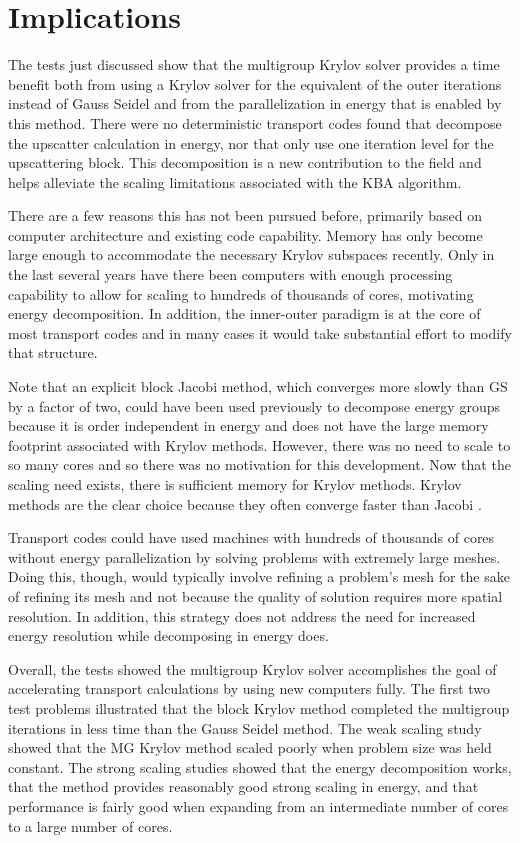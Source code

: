 \section{Implications}
The tests just discussed show that the multigroup Krylov solver provides a time benefit both from using a Krylov solver for the equivalent of the outer iterations instead of Gauss Seidel and from the parallelization in energy that is enabled by this method. There were no deterministic transport codes found that decompose the upscatter calculation in energy, nor that only use one iteration level for the upscattering block. This decomposition is a new contribution to the field and helps alleviate the scaling limitations associated with the KBA algorithm.   

There are a few reasons this has not been pursued before, primarily based on computer architecture and existing code capability. Memory has only become large enough to accommodate the necessary Krylov subspaces recently. Only in the last several years have there been computers with enough processing capability to allow for scaling to hundreds of thousands of cores, motivating energy decomposition. In addition, the inner-outer paradigm is at the core of most transport codes and in many cases it would take substantial effort to modify that structure. 

Note that an explicit block Jacobi method, which converges more slowly than GS by a factor of two, could have been used previously to decompose energy groups because it is order independent in energy and does not have the large memory footprint associated with Krylov methods. However, there was no need to scale to so many cores and so there was no motivation for this development. Now that the scaling need exists, there is sufficient memory for Krylov methods. Krylov methods are the clear choice because they often converge faster than Jacobi \cite{LeVeque2007}. 

Transport codes could have used machines with hundreds of thousands of cores without energy parallelization by solving problems with extremely large meshes. Doing this, though, would typically involve refining a problem's mesh for the sake of refining its mesh and not because the quality of solution requires more spatial resolution. In addition, this strategy does not address the need for increased energy resolution while decomposing in energy does. 

Overall, the tests showed the multigroup Krylov solver accomplishes the goal of accelerating transport calculations by using new computers fully. The first two test problems illustrated that the block Krylov method completed the multigroup iterations in less time than the Gauss Seidel method. The weak scaling study showed that the MG Krylov method scaled poorly when problem size was held constant. The strong scaling studies showed that the energy decomposition works, that the method provides reasonably good strong scaling in energy, and that performance is fairly good when expanding from an intermediate number of cores to a large number of cores. 

\separatorpage{}
